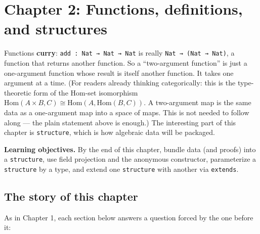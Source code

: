 \chapter{Chapter 2: Functions, definitions, and structures}\label{sec:02-functions-and-structures:00-index:1}

Functions \textbf{curry}: \texttt{add : Nat → Nat → Nat} is really \texttt{Nat → (Nat → Nat)}, a function that returns another function. So a ``two-argument function'' is just a one-argument function whose result is itself another function. It takes one argument at a time. (For readers already thinking categorically: this is the type-theoretic form of the Hom-set isomorphism \(\mathrm{Hom}(A\times B, C)\cong\mathrm{Hom}(A,\mathrm{Hom}(B,C))\). A two-argument map is the same data as a one-argument map into a space of maps. This is not needed to follow along --- the plain statement above is enough.) The interesting part of this chapter is \texttt{structure}, which is how algebraic data will be packaged.

\textbf{Learning objectives.} By the end of this chapter, bundle data (and proofs) into a \texttt{structure}, use field projection and the anonymous constructor, parameterize a \texttt{structure} by a type, and extend one \texttt{structure} with another via \texttt{extends}.

\section{The story of this chapter}\label{sec:02-functions-and-structures:00-index:2}

As in Chapter 1, each section below answers a question forced by the one before it:

